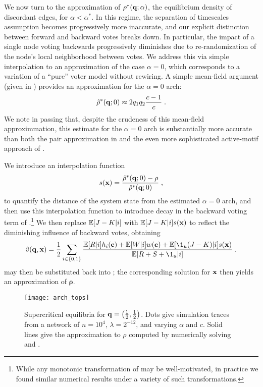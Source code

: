 \documentclass[review, onefignum, onetabnum]{siamart171218}
\begin{document}
		We now turn to the approximation of $\rho^*(\mathbf{q};\alpha)$, the equilibrium density of discordant edges, for $\alpha < \alpha^*$. 
		In this regime, the separation of timescales assumption becomes progressively more inaccurate, and our explicit distinction between forward and backward votes breaks down. 
		In particular, the impact of a single node voting backwards progressively diminishes due to re-randomization of the node's local neighborhood between votes. 
		We address this via simple interpolation to an approximation of the case $\alpha = 0$, which corresponds to a variation of a ``pure'' voter model without rewiring. 
		A simple mean-field argument (given in ) provides an approximation for the $\alpha = 0$ arch:
		\begin{align}
			\hat{\rho}^*(\q; 0) \approx 2q_1q_2\frac{c-1}{c}\;. \label{eq:alpha_0}
		\end{align}
		We note in passing that, despite the crudeness of this mean-field approximmation, this estimate for the $\alpha = 0$ arch is substantially more accurate than both the pair approximation in \cite{Durrett2012} and the even more sophisticated active-motif approach of \cite{Demirel2012}. 

		We introduce an interpolation function 
		\begin{align}
			s(\x) = \frac{\hat{\rho}^*(\q;0) - \rho}{\hat{\rho}^*(\q;0)}\;, \label{eq:interpolation}
		\end{align}
		to quantify the distance of the system state from the estimated $\alpha = 0$ arch, and then use this interpolation function to introduce decay in the backward voting term of  .\footnote{While any monotonic transformation of   may be well-motivated, in practice we found similar numerical results under a variety of such transformations.}
		We then replace $\mathbb{E}[J - K|i]$ with $\mathbb{E}[J - K|i]s(\mathbf{x})$ to reflect the diminishing influence of backward votes, obtaining 
		\begin{equation}
			\hat{v}(\q, \x) = \frac{1}{2} \sum_{i \in \{0,1\}} \frac{\E[R|i]h_i(\C) + \E[W|i]w(\C) + \E[\1_u(J-K)|i]s(\x)}{\E[R + S + \1_u|i]}\;.  \label{eq:component_approx_super}
		\end{equation}
		 may then be substituted back into ; the corresponding solution for $\mathbf{x}$ then yields an approximation of $\mathbf{\rho}$. 
		\begin{figure}
			\centering
				\texttt{[image: arch\_tops]}
			\caption{Supercritical equilibria for $\mathbf{q} = \left(\frac{1}{2}, \frac{1}{2}\right)$.
			Dots give simulation traces from a network of $n = 10^4$, $\lambda = 2^{-12}$, and varying $\alpha$ and $c$.
			Solid lines give the approximation to $\rho$ computed by numerically solving  and .} \label{fig:arch_tops}
		\end{figure}
		
\end{document}
